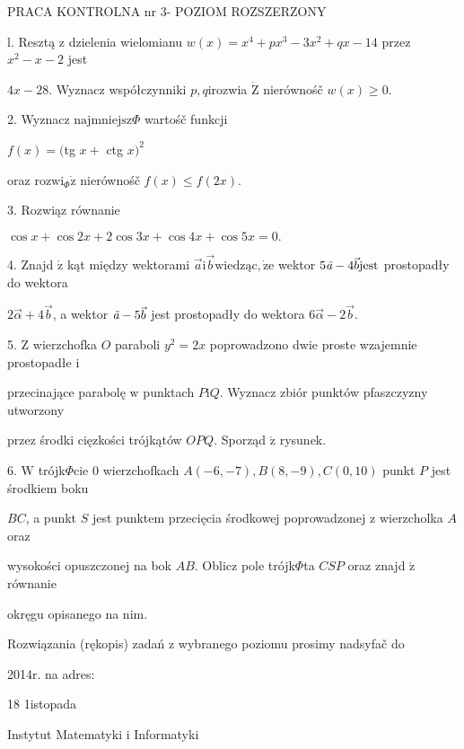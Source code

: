 \documentclass[a4paper,12pt]{article}
\begin{document}
PRACA KONTROLNA nr 3- POZIOM ROZSZERZONY

l. Resztą $\mathrm{z}$ dzielenia wielomianu $w(x) =x^{4}+px^{3}-3x^{2}+qx-14$ przez $x^{2}-x-2$ jest

$4x-28$. Wyznacz współczynniki $p, q\mathrm{i}$rozwia $\dot{\mathrm{Z}}$ nierównośč $w(x)\geq 0.$

2. Wyznacz $\mathrm{n}\mathrm{a}\mathrm{j}\mathrm{m}\mathrm{n}\mathrm{i}\mathrm{e}\mathrm{j}\mathrm{s}\mathrm{z}\Phi$ wartośč funkcji

$f(x)=($tg $x+$ ctg $x)^{2}$

oraz $\mathrm{r}\mathrm{o}\mathrm{z}\mathrm{w}\mathrm{i}_{\Phi}\dot{\mathrm{z}}$ nierównośč $f(x)\leq f(2x).$

3. Rozwiąz równanie

$\cos x+\cos 2x+2\cos 3x+\cos 4x+\cos 5x=0.$

4. Znajd $\acute{\mathrm{z}}$ kąt między wektorami $\vec{a}\mathrm{i}\vec{b}\mathrm{w}\mathrm{i}\mathrm{e}\mathrm{d}\mathrm{z}\text{ą} \mathrm{c}, \dot{\mathrm{z}}\mathrm{e}$ wektor $5\text{{\it ã}}-4\vec{b}\mathrm{j}\mathrm{e}\mathrm{s}\mathrm{t}$ prostopadły do wektora

$2\vec{\alpha}+4\vec{b}$, a wektor $\text{{\it ã}}-5\vec{b}$ jest prostopadły do wektora $6\vec{\alpha}-2\vec{b}.$

5. $\mathrm{Z}$ wierzchofka $O$ paraboli $y^{2}=2x$ poprowadzono dwie proste wzajemnie prostopadłe $\mathrm{i}$

przecinające parabolę $\mathrm{w}$ punktach $P\mathrm{i}Q$. Wyznacz zbiór punktów pfaszczyzny utworzony

przez środki cięzkości trójkątów $OPQ.$ Sporząd $\acute{\mathrm{z}}$ rysunek.

6. $\mathrm{W}$ trójk$\Phi$cie $0$ wierzchofkach $A(-6,-7), B(8,-9), C(0,10)$ punkt $P$ jest środkiem boku

$BC$, a punkt $S$ jest punktem przecięcia środkowej poprowadzonej $\mathrm{z}$ wierzcholka $A$ oraz

wysokości opuszczonej na bok $AB$. Oblicz pole trójk$\Phi$ta $CSP$ oraz znajd $\acute{\mathrm{z}}$ równanie

okręgu opisanego na nim.

Rozwiązania (rękopis) zadań z wybranego poziomu prosimy nadsyfač do

2014r. na adres:

18 1istopada

Instytut Matematyki $\mathrm{i}$ Informatyki
\end{document}
